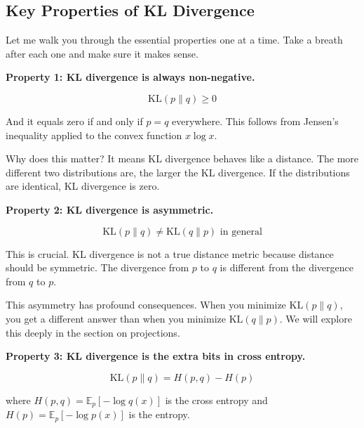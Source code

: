\vspace{1.5em}

\subsection{Key Properties of KL Divergence}

Let me walk you through the essential properties one at a time. Take a breath after each one and make sure it makes sense.

\vspace{1em}

\textbf{Property 1: KL divergence is always non-negative.}

\begin{equation}
\text{KL}(p \| q) \geq 0
\end{equation}

And it equals zero if and only if $p = q$ everywhere. This follows from Jensen's inequality applied to the convex function $x \log x$.

Why does this matter? It means KL divergence behaves like a distance. The more different two distributions are, the larger the KL divergence. If the distributions are identical, KL divergence is zero.

\vspace{1em}

\textbf{Property 2: KL divergence is asymmetric.}

\begin{equation}
\text{KL}(p \| q) \neq \text{KL}(q \| p) \text{ in general}
\end{equation}

This is crucial. KL divergence is not a true distance metric because distance should be symmetric. The divergence from $p$ to $q$ is different from the divergence from $q$ to $p$.

This asymmetry has profound consequences. When you minimize $\text{KL}(p \| q)$, you get a different answer than when you minimize $\text{KL}(q \| p)$. We will explore this deeply in the section on projections.

\vspace{1em}

\textbf{Property 3: KL divergence is the extra bits in cross entropy.}

\begin{equation}
\text{KL}(p \| q) = H(p, q) - H(p)
\end{equation}

where $H(p, q) = \mathbb{E}_{p}[-\log q(x)]$ is the cross entropy and $H(p) = \mathbb{E}_{p}[-\log p(x)]$ is the entropy.

